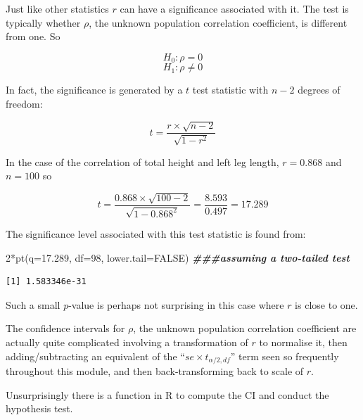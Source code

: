 \documentclass[
  oneside]{krantz}
\newenvironment{Shaded}{\begin{snugshade}}{\end{snugshade}}
\newcommand{\AttributeTok}[1]{\textcolor[rgb]{0.77,0.63,0.00}{#1}}
\newcommand{\ConstantTok}[1]{\textcolor[rgb]{0.00,0.00,0.00}{#1}}
\newcommand{\DecValTok}[1]{\textcolor[rgb]{0.00,0.00,0.81}{#1}}
\newcommand{\DocumentationTok}[1]{\textcolor[rgb]{0.56,0.35,0.01}{\textbf{\textit{#1}}}}
\newcommand{\FloatTok}[1]{\textcolor[rgb]{0.00,0.00,0.81}{#1}}
\newcommand{\FunctionTok}[1]{\textcolor[rgb]{0.00,0.00,0.00}{#1}}
\newcommand{\NormalTok}[1]{#1}
\newcommand{\SpecialCharTok}[1]{\textcolor[rgb]{0.00,0.00,0.00}{#1}}
\begin{document}
Just like other statistics \(r\) can have a significance associated with it. The test is typically whether \(\rho\), the unknown population correlation coefficient, is different from one. So

\[H_0:  \rho = 0\]
\[H_1:  \rho \neq 0\]

In fact, the significance is generated by a \(t\) test statistic with \(n-2\) degrees of freedom:

\[t = \frac{r \times \sqrt{n-2}}{\sqrt {1-r^2}}\]

In the case of the correlation of total height and left leg length, \(r = 0.868\) and \(n=100\) so

\[t = \frac{0.868 \times \sqrt{100-2}}{\sqrt {1-0.868^2}}= \frac{8.593}{0.497} = 17.289\]

The significance level associated with this test statistic is found from:

\begin{Shaded}
\begin{Highlighting}[]
\DecValTok{2}\SpecialCharTok{*}\FunctionTok{pt}\NormalTok{(}\AttributeTok{q=}\FloatTok{17.289}\NormalTok{, }\AttributeTok{df=}\DecValTok{98}\NormalTok{, }\AttributeTok{lower.tail=}\ConstantTok{FALSE}\NormalTok{) }\DocumentationTok{\#\#\#assuming a two{-}tailed test }
\end{Highlighting}
\end{Shaded}

\begin{verbatim}
[1] 1.583346e-31
\end{verbatim}

Such a small \(p\)-value is perhaps not surprising in this case where \(r\) is close to one.

The confidence intervals for \(\rho\), the unknown population correlation coefficient are actually quite complicated involving a transformation of \(r\) to normalise it, then adding/subtracting an equivalent of the ``\(se \times t_{\alpha/2, df}\)'' term seen so frequently throughout this module, and then back-transforming back to scale of \(r\).

Unsurprisingly there is a function in R to compute the CI and conduct the hypothesis test.

\begin{Shaded}
\end{Shaded}
\end{document}
